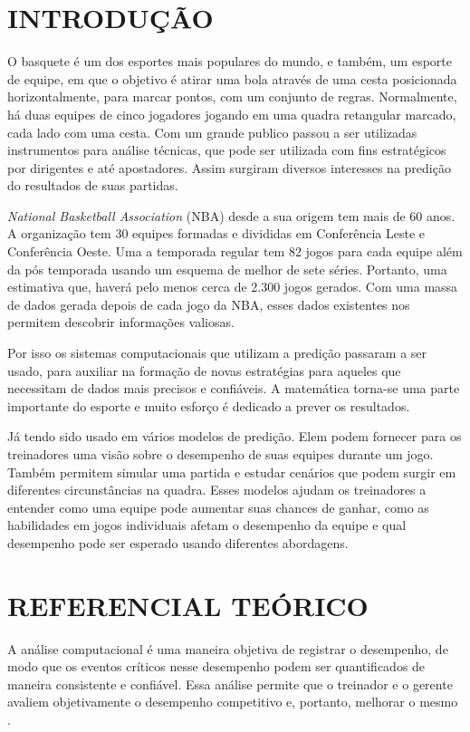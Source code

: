 \newpage
\section{INTRODUÇÃO}


O basquete é um dos esportes mais populares do mundo, e também, um esporte de equipe, em que o objetivo é atirar uma bola através de uma cesta posicionada horizontalmente, para marcar pontos, com um conjunto de regras. Normalmente, há duas equipes de cinco jogadores jogando em uma quadra retangular marcado, cada lado com uma cesta. Com um grande publico passou a ser utilizadas instrumentos para análise técnicas, que pode ser utilizada com fins estratégicos por dirigentes e até apostadores. Assim surgiram diversos interesses na predição do resultados de suas partidas. 

\textit{National Basketball Association} (NBA) desde a sua origem tem mais de 60 anos. A organização tem 30 equipes formadas e divididas em Conferência Leste e Conferência Oeste. Uma a temporada regular tem 82 jogos para cada equipe além da pós temporada usando um esquema de melhor de sete séries. Portanto, uma estimativa que, haverá pelo menos cerca de 2.300 jogos gerados. Com uma massa de dados gerada depois de cada jogo da NBA, esses dados existentes nos permitem descobrir informações valiosas.

Por isso os sistemas computacionais que utilizam a predição passaram a ser usado, para auxiliar na formação de novas estratégias para aqueles que necessitam de dados mais precisos e confiáveis. A matemática torna-se uma parte importante do esporte e muito esforço é dedicado a prever os resultados.

Já tendo sido usado em vários modelos de predição. Elem podem fornecer para os treinadores uma visão sobre o desempenho de suas equipes durante um jogo. Também permitem simular uma partida e estudar cenários que podem surgir em diferentes circunstâncias na quadra. Esses modelos ajudam os treinadores a entender como uma equipe pode aumentar suas chances de ganhar, como as habilidades em jogos individuais afetam o desempenho da equipe e qual desempenho pode ser esperado usando diferentes abordagens.


\section{REFERENCIAL TEÓRICO}
A análise computacional é uma maneira objetiva de registrar o desempenho, de modo que os eventos críticos nesse desempenho podem ser quantificados de maneira consistente e confiável. Essa análise permite que o treinador e o gerente avaliem objetivamente o desempenho competitivo e, portanto, melhorar o mesmo \cite{Taylor2004}. 

